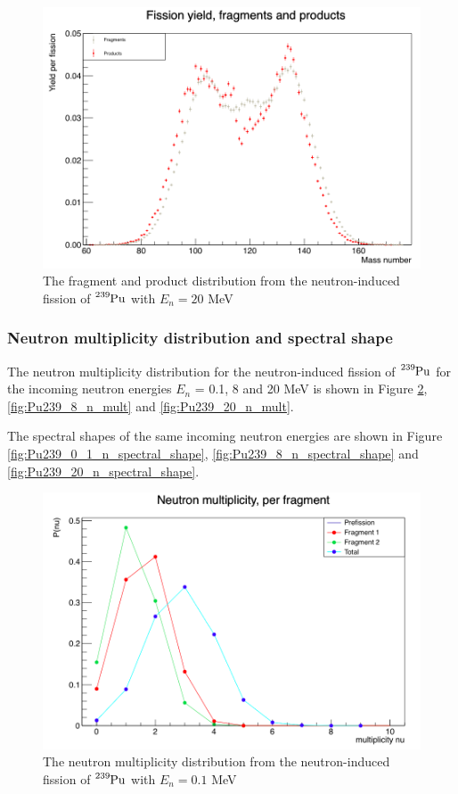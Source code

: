\documentclass[]{article}
\begin{document}
\begin{figure} [H]
	\centering
	\includegraphics[scale=0.36]{Pu239_20_fragment_products.png}
	\caption{The fragment and product distribution from the neutron-induced fission of $\ce{^{239}Pu}$ with $E_n = 20$ MeV}
	\label{fig:Pu239_20_fragment_product}
\end{figure}

\subsubsection{Neutron multiplicity distribution and spectral shape}

The neutron multiplicity distribution for the neutron-induced fission of $\ce{^{239}Pu}$ for the incoming neutron energies $E_n$ = 0.1, 8 and 20 MeV is shown in Figure \ref{fig:Pu239_0_1_n_mult}, \ref{fig:Pu239_8_n_mult} and \ref{fig:Pu239_20_n_mult}.

The spectral shapes of the same incoming neutron energies are shown in Figure \ref{fig:Pu239_0_1_n_spectral_shape}, \ref{fig:Pu239_8_n_spectral_shape} and \ref{fig:Pu239_20_n_spectral_shape}.

\begin{figure} [H]
	\centering
	\includegraphics[scale=0.36]{Pu239_0_1_n_mult.png}
	\caption{The neutron multiplicity distribution from the neutron-induced fission of $\ce{^{239}Pu}$ with $E_n = 0.1$ MeV}
	\label{fig:Pu239_0_1_n_mult}
\end{figure}
\end{document}
